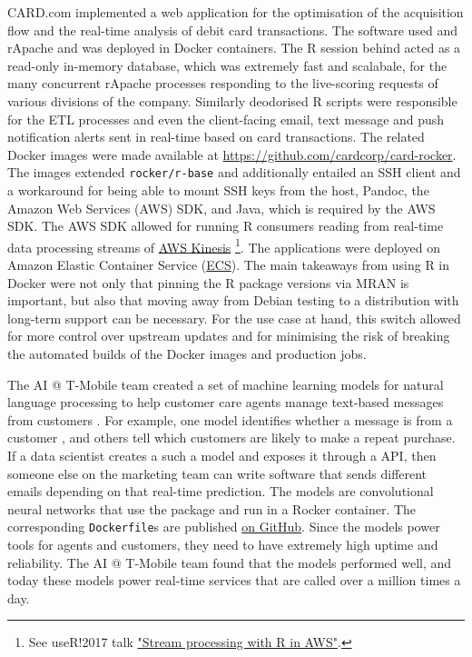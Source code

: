 CARD.com implemented a web application for the optimisation of the
acquisition flow and the real-time analysis of debit card transactions.
The software used  and rApache and was deployed in Docker
containers. The R session behind  acted as a read-only
in-memory database, which was extremely fast and scalabale, for the many
concurrent rApache processes responding to the live-scoring requests of
various divisions of the company. Similarly deodorised R scripts were
responsible for the ETL processes and even the client-facing email, text
message and push notification alerts sent in real-time based on card
transactions. The related Docker images were made available at
\url{https://github.com/cardcorp/card-rocker}. The images extended
\texttt{rocker/r-base} and additionally entailed an SSH client and a
workaround for being able to mount SSH keys from the host, Pandoc, the
Amazon Web Services (AWS) SDK, and Java, which is required by the AWS
SDK. The AWS SDK allowed for running R consumers reading from real-time
data processing streams of \href{https://aws.amazon.com/kinesis/}{AWS
Kinesis}
\footnote{See useR!2017 talk \href{https://static.sched.com/hosted\_files/user2017/2f/AWR Kinesis at useR 2017.pdf}{"Stream processing with R in AWS"}.}.
The applications were deployed on Amazon Elastic Container Service
(\href{https://aws.amazon.com/ecs/}{ECS}). The main takeaways from using
R in Docker were not only that pinning the R package versions via MRAN
is important, but also that moving away from Debian testing to a
distribution with long-term support can be necessary. For the use case
at hand, this switch allowed for more control over upstream updates and
for minimising the risk of breaking the automated builds of the Docker
images and production jobs.

The AI @ T-Mobile team created a set of machine learning models for
natural language processing to help customer care agents manage
text-based messages from customers \citep{t-mobile_enterprise_2018}. For
example, one model identifies whether a message is from a customer
\citep[see -based \href{https://secure.message.t-mobile.com/v1/shiny/is-customer/app/}{demo} further described by ][]{nolis_small_2019},
and others tell which customers are likely to make a repeat purchase. If
a data scientist creates a such a model and exposes it through a
 API, then someone else on the marketing team can write
software that sends different emails depending on that real-time
prediction. The models are convolutional neural networks that use the
 package \citep{cran_keras} and run in a Rocker
container. The corresponding \texttt{Dockerfile}s are published
\href{https://github.com/tmobile/r-tensorflow-api}{on GitHub}. Since the
models power tools for agents and customers, they need to have extremely
high uptime and reliability. The AI @ T-Mobile team found that the
models performed well, and today these models power real-time services
that are called over a million times a day.

